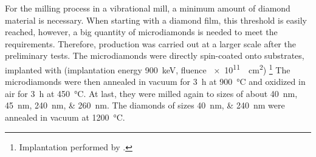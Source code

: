 	For the milling process in a vibrational mill, a minimum amount of diamond material is necessary.
	When starting with a diamond film, this threshold is easily reached, however, a big quantity of microdiamonds is needed to meet the requirements.
	Therefore, production was carried out at a larger scale after the preliminary tests.
	The microdiamonds were directly spin-coated onto \ir substrates, implanted with  (implantation energy \SI{900}{keV}, fluence \SI{e11}{\per\centi\meter\squared}) \footnote{Implantation performed by \klug.}
	The microdiamonds were then annealed in vacuum for \SI{3}{\hour} at \SI{900}{\celsius} and oxidized in air for \SI{3}{\hour} at \SI{450}{\celsius}.
	At last, they were milled again to sizes of about \SIlist{40;45;240;260}{nm}.
	The diamonds of sizes \SIlist{40;240}{nm} were annealed in vacuum at \SI{1200}{\celsius}.





